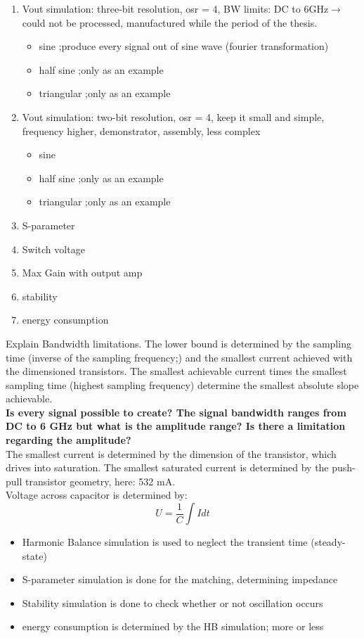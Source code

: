 \begin{enumerate}
	\item Vout simulation: three-bit resolution, osr = 4, BW limits: DC to 6GHz$\rightarrow$ could not be processed, manufactured while the period of the thesis. 
	\begin{itemize}
		\item sine ;produce every signal out of sine wave (fourier transformation)
		\item half sine ;only as an example
		\item triangular ;only as an example
	\end{itemize}
	\item Vout simulation: two-bit resolution, osr = 4, keep it small and simple, frequency higher, demonstrator, assembly, less complex
	\begin{itemize}
		\item sine
		\item half sine ;only as an example
		\item triangular ;only as an example
	\end{itemize}
	\item S-parameter		
	\item Switch voltage
	\item Max Gain with output amp
	\item stability
	\item energy consumption
\end{enumerate}
Explain Bandwidth limitations. The lower bound is determined by the sampling time (inverse of the sampling frequency;) and the smallest current achieved with the dimensioned transistors. The smallest achievable current times the smallest sampling time (highest sampling frequency) determine the smallest absolute slope achievable. \\ \textbf{Is every signal possible to create? The signal bandwidth ranges from DC to 6 GHz but what is the amplitude range? Is there a limitation regarding the amplitude?}
\\
The smallest current is determined by the dimension of the transistor, which drives into saturation. The smallest saturated current is determined by the push-pull transistor geometry, here: 532 mA.\\Voltage across capacitor is determined by:
\begin{equation}
U = \frac{1}{C} \int I  dt 
\end{equation}

\begin{itemize}
	\item Harmonic Balance simulation is used to neglect the transient time (steady-state)
	\item S-parameter simulation is done for the matching, determining impedance
	\item Stability simulation is done to check whether or not oscillation occurs
	\item energy consumption is determined by the HB simulation; more or less
\end{itemize}

